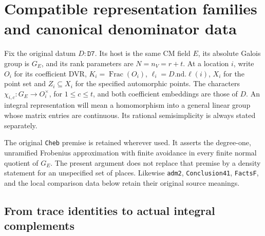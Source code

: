 \section{Compatible representation families and canonical denominator data}
\label{sec:denominator-family-v051}


Fix the original datum $D:\texttt{D7}$. Its host is the same CM field
$E$, its absolute Galois group is $G_E$, and its rank parameters are
$N=n_V=r+t$. At a location $i$, write $O_i$ for its coefficient DVR,
$K_i=\operatorname{Frac}(O_i)$, $\ell_i=D.\mathrm{nd}.\ell(i)$,
$X_i$ for the point set and $Z_i\subseteq X_i$ for the specified
automorphic points. The characters $\chi_{i,c}:G_E\to O_i^\times$,
for $1\le c\le t$, and both coefficient embeddings are those of $D$.
An integral representation will mean a homomorphism into a general
linear group whose matrix entries are continuous. Its rational
semisimplicity is always stated separately.

The original \texttt{Cheb} premise is retained wherever used. It
asserts the degree-one, unramified Frobenius approximation with finite
avoidance in every finite normal quotient of $G_E$. The present
argument does not replace that premise by a density statement for an
unspecified set of places. Likewise \texttt{adm2},
\texttt{Conclusion41}, \texttt{Facts\allowbreak F}, and the local comparison data
below retain their original source meanings.

\subsection{From trace identities to actual integral complements}

